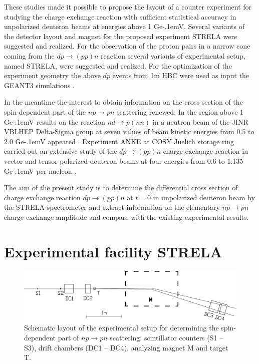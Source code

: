 \documentclass[twocolumn,epjc3]{svjour3}
\newcommand{\np}     {\ensuremath{np \rightarrow pn}\xspace}
\newcommand{\dpchex} {\ensuremath{dp \rightarrow (pp)n}\xspace}
\newcommand{\GeV}    {Ge\kern-.1emV\xspace}
\begin{document}
These studies made it possible to propose the layout of a counter experiment for
studying the charge exchange reaction with sufficient statistical accuracy in
unpolarized deuteron beams at energies above 1 \GeV. Several variants of the
detector layout and magnet for the proposed experiment STRELA were suggested and
realized. For the observation of the proton pairs in a narrow cone coming from
the \dpchex reaction several variants of experimental setup, named STRELA,
were suggested and realized. For the optimization of the experiment geometry the
above $dp$ events from 1m HBC were used as input the GEANT3 simulations
\cite{gla13}.

In the meantime the interest to obtain information on the cross section of the
spin-dependent part of the \np scattering renewed. In the region above 1 \GeV
results on the reaction $nd \rightarrow p(nn)$ in a neutron beam of the JINR
VBLHEP Delta-Sigma group at seven values of beam kinetic energies from 0.5 to
2.0 \GeV appeared \cite{sha09,sha09_2,shi11}. Experiment ANKE at COSY Juelich
storage ring carried out an extensive study of the \dpchex charge exchange
reaction in vector and tensor polarized deuteron beams at four energies from 0.6
to 1.135 \GeV per nucleon \cite{chi09,mch13}.

The aim of the present study is to determine the differential cross section of
charge exchange reaction \dpchex at $t = 0$ in unpolarized deuteron beam
by the STRELA spectrometer and extract information on the elementary \np
charge exchange amplitude and compare with the existing experimental results.

\section{Experimental facility STRELA}

\begin{figure}[t] %
  \centering
  \includegraphics[width=1.00\textwidth]{STRELA_layout.pdf}
  \caption{Schematic layout of the experimental setup for determining the
    spin-dependent part of \np scattering: scintillator counters (S1 -- S3),
    drift chambers (DC1 -- DC4), analyzing magnet M and target T.}
  \label{fig:STRELA_layout}
\end{figure}
\end{document}
